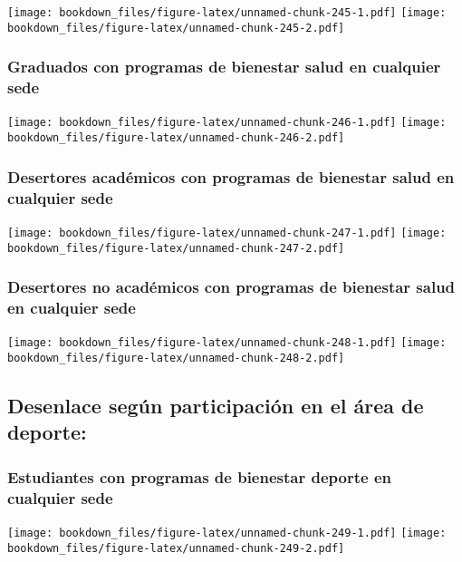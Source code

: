 \documentclass[]{article}
\theoremstyle{definition}
\theoremstyle{definition}
\theoremstyle{definition}
\theoremstyle{remark}
\begin{document}
\texttt{[image: bookdown\_files/figure-latex/unnamed-chunk-245-1.pdf]}
\texttt{[image: bookdown\_files/figure-latex/unnamed-chunk-245-2.pdf]}

\subsubsection{Graduados con programas de bienestar salud en cualquier
sede}\label{graduados-con-programas-de-bienestar-salud-en-cualquier-sede-2}

\texttt{[image: bookdown\_files/figure-latex/unnamed-chunk-246-1.pdf]}
\texttt{[image: bookdown\_files/figure-latex/unnamed-chunk-246-2.pdf]}

\subsubsection{Desertores académicos con programas de bienestar salud en
cualquier
sede}\label{desertores-academicos-con-programas-de-bienestar-salud-en-cualquier-sede-2}

\texttt{[image: bookdown\_files/figure-latex/unnamed-chunk-247-1.pdf]}
\texttt{[image: bookdown\_files/figure-latex/unnamed-chunk-247-2.pdf]}

\subsubsection{Desertores no académicos con programas de bienestar salud
en cualquier
sede}\label{desertores-no-academicos-con-programas-de-bienestar-salud-en-cualquier-sede-2}

\texttt{[image: bookdown\_files/figure-latex/unnamed-chunk-248-1.pdf]}
\texttt{[image: bookdown\_files/figure-latex/unnamed-chunk-248-2.pdf]}

\subsection{Desenlace según participación en el área de
deporte:}\label{desenlace-segun-participacion-en-el-area-de-deporte-1}

\subsubsection{Estudiantes con programas de bienestar deporte en
cualquier
sede}\label{estudiantes-con-programas-de-bienestar-deporte-en-cualquier-sede-1}

\texttt{[image: bookdown\_files/figure-latex/unnamed-chunk-249-1.pdf]}
\texttt{[image: bookdown\_files/figure-latex/unnamed-chunk-249-2.pdf]}
\end{document}
